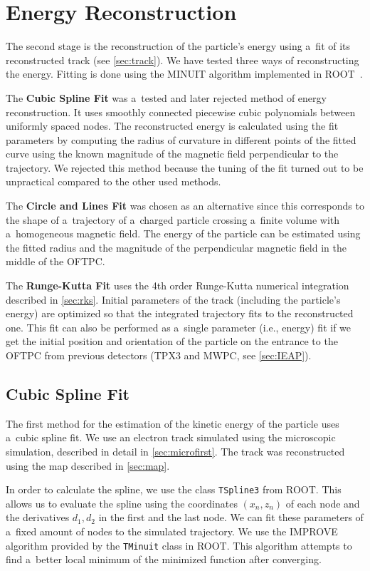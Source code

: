 \chapter{Energy Reconstruction}
\label{sec:energy}
	The second stage is the reconstruction of the particle's energy using a~fit of its reconstructed track (see \cref{sec:track}). We have tested three ways of reconstructing the energy. Fitting is done using the MINUIT algorithm implemented in ROOT~\cite{ROOT}.
	
	The \textbf{Cubic Spline Fit} was a~tested and later rejected method of energy reconstruction. It uses smoothly connected piecewise cubic polynomials between uniformly spaced nodes. The reconstructed energy is calculated using the fit parameters by computing the radius of curvature in different points of the fitted curve using the known magnitude of the magnetic field perpendicular to the trajectory. We rejected this method because the tuning of the fit turned out to be unpractical compared to the other used methods.
	
	The \textbf{Circle and Lines Fit} was chosen as an alternative since this corresponds to the shape of a~trajectory of a~charged particle crossing a~finite volume with a~homogeneous magnetic field. The energy of the particle can be estimated using the fitted radius and the magnitude of the perpendicular magnetic field in the middle of the \ac{OFTPC}.
	
	The \textbf{Runge-Kutta Fit} uses the 4th order Runge-Kutta numerical integration described in \cref{sec:rks}. Initial parameters of the track (including the particle's energy) are optimized so that the integrated trajectory fits to the reconstructed one. This fit can also be performed as a~single parameter (i.e., energy) fit if we get the initial position and orientation of the particle on the entrance to the \ac{OFTPC} from previous detectors (\ac{TPX3} and \ac{MWPC}, see \cref{sec:IEAP}).
	
	\section{Cubic Spline Fit}
	\label{sec:cspline}
		The first method for the estimation of the kinetic energy of the particle uses a~cubic spline fit. We use an electron track simulated using the microscopic simulation, described in detail in \cref{sec:microfirst}. The track was reconstructed using the map described in \cref{sec:map}.
				
		In order to calculate the spline, we use the class \texttt{TSpline3} from ROOT. This allows us to evaluate the spline using the coordinates $(x_n,z_n)$ of each node and the derivatives $d_1,d_2$ in the first and the last node. We can fit these parameters of a~fixed amount of nodes to the simulated trajectory. We use the IMPROVE algorithm provided by the \texttt{TMinuit} class in ROOT. This algorithm attempts to find a~better local minimum of the minimized function after converging.
		
